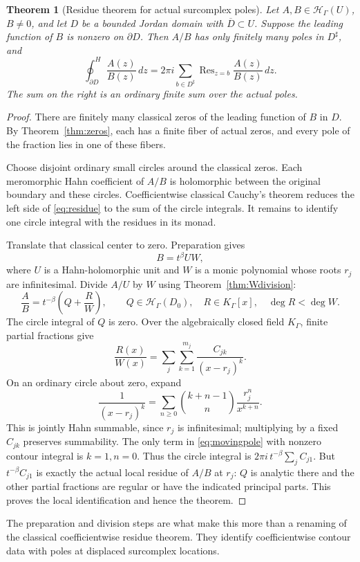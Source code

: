 \documentclass[11pt,a4paper]{article}
\newtheorem{theorem}{Theorem}[section]
\theoremstyle{definition}
\theoremstyle{remark}
\newcommand{\HH}{\mathcal H}
\newcommand{\Res}{\operatorname{Res}}
\newcommand{\Hoint}{\mathop{\oint}\nolimits^{\!H}}
\begin{document}
\begin{theorem}[Residue theorem for actual surcomplex poles]\label{thm:residue}
Let $A,B\in\HH_\Gamma(U)$, $B\ne0$, and let $D$ be a bounded
Jordan domain with $\overline D\subset U$. Suppose the leading
function of $B$ is nonzero on $\partial D$. Then $A/B$ has only
finitely many poles in $D^\sharp$, and
\begin{equation}\label{eq:residue}
 \Hoint_{\partial D}\frac{A(z)}{B(z)}\,dz
  =2\pi i\sum_{b\in D^\sharp}
          \Res_{z=b}\frac{A(z)}{B(z)}\,dz.
\end{equation}
The sum on the right is an ordinary finite sum over the actual poles.
\end{theorem}
\begin{proof}
There are finitely many classical zeros of the leading function of
$B$ in $D$. By Theorem~\ref{thm:zeros}, each has a finite fiber of
actual zeros, and every pole of the fraction lies in one of these
fibers.

Choose disjoint ordinary small circles around the classical zeros.
Each meromorphic Hahn coefficient of $A/B$ is holomorphic between
the original boundary and these circles. Coefficientwise classical
Cauchy's theorem reduces the left side of \eqref{eq:residue} to the
sum of the circle integrals. It remains to identify one circle integral
with the residues in its monad.

Translate that classical center to zero. Preparation gives
\[
 B=t^\beta UW,
\]
where $U$ is a Hahn-holomorphic unit and $W$ is a monic polynomial
whose roots $r_j$ are infinitesimal. Divide $A/U$ by $W$ using
Theorem~\ref{thm:Wdivision}:
\[
 \frac AB=t^{-\beta}\left(Q+\frac RW\right),
 \qquad Q\in\HH_\Gamma(D_0),\quad R\in K_\Gamma[x],\quad\deg R<\deg W.
\]
The circle integral of $Q$ is zero. Over the algebraically closed
field $K_\Gamma$, finite partial fractions give
\[
 \frac{R(x)}{W(x)}=\sum_j\sum_{k=1}^{m_j}
                    \frac{C_{jk}}{(x-r_j)^k}.
\]
On an ordinary circle about zero, expand
\begin{equation}\label{eq:movingpole}
 \frac1{(x-r_j)^k}
  =\sum_{n\ge0}{k+n-1\choose n}\frac{r_j^n}{x^{k+n}}.
\end{equation}
This is jointly Hahn summable, since $r_j$ is infinitesimal; multiplying
by a fixed $C_{jk}$ preserves summability. The only term in
\eqref{eq:movingpole} with nonzero contour integral is $k=1,n=0$.
Thus the circle integral is
$2\pi i\,t^{-\beta}\sum_j C_{j1}$. But $t^{-\beta}C_{j1}$ is
exactly the actual local residue of $A/B$ at $r_j$: $Q$ is analytic
there and the other partial fractions are regular or have the
indicated principal parts. This proves the local identification and
hence the theorem.
\end{proof}
The preparation and division steps are what make this more than a
renaming of the classical coefficientwise residue theorem. They
identify coefficientwise contour data with poles at displaced
surcomplex locations.
\end{document}
